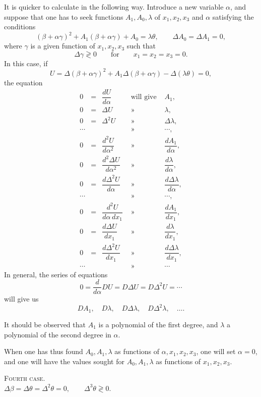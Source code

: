 \documentclass[11pt]{article}
\begin{document}
It is quicker to calculate in the following way. Introduce a new variable $\alpha$, and suppose that one has to seek functions $A_1,A_0,\lambda$ of $x_1,x_2,x_3$ and $\alpha$ satisfying the conditions
\[
(\beta+\alpha\gamma)^2+A_1(\beta+\alpha\gamma)+A_0=\lambda\theta,
\qquad
\Delta A_0=\Delta A_1=0,
\]
where $\gamma$ is a given function of $x_1,x_2,x_3$ such that
\[
\Delta\gamma\gtrless0\qquad \text{for}\qquad x_1=x_2=x_3=0.
\]
In this case, if
\[
U=\Delta(\beta+\alpha\gamma)^2+A_1\Delta(\beta+\alpha\gamma)-\Delta(\lambda\theta)=0,
\]
the equation
\[
\begin{array}{rclcl}
0&=&\dfrac{dU}{d\alpha}&\text{ will give }&A_1,\\[0.2em]
0&=&\Delta U&\text{ » }&\lambda,\\
0&=&\Delta^2 U&\text{ » }&\Delta\lambda,\\
\cdots&&&\text{ » }&\cdots,\\[0.2em]
0&=&\dfrac{d^2U}{d\alpha^2}&\text{ » }&\dfrac{dA_1}{d\alpha},\\[0.2em]
0&=&\dfrac{d^2\Delta U}{d\alpha^2}&\text{ » }&\dfrac{d\lambda}{d\alpha},\\[0.2em]
0&=&\dfrac{d\Delta^2 U}{d\alpha}&\text{ » }&\dfrac{d\Delta\lambda}{d\alpha},\\
\cdots&&&\text{ » }&\cdots,\\[0.2em]
0&=&\dfrac{d^2U}{d\alpha\,dx_1}&\text{ » }&\dfrac{dA_1}{dx_1},\\[0.2em]
0&=&\dfrac{d\Delta U}{dx_1}&\text{ » }&\dfrac{d\lambda}{dx_1},\\[0.2em]
0&=&\dfrac{d\Delta^2 U}{dx_1}&\text{ » }&\dfrac{d\Delta\lambda}{dx_1},\\
\cdots&&&\text{ » }&\cdots
\end{array}
\]
In general, the series of equations
\[
0=\frac{d}{d\alpha}DU=D\Delta U=D\Delta^2U=\cdots
\]
will give us
\[
DA_1,\quad D\lambda,\quad D\Delta\lambda,\quad D\Delta^2\lambda,\quad \ldots.
\]

It should be observed that $A_1$ is a polynomial of the first degree, and $\lambda$ a polynomial of the second degree in $\alpha$.

When one has thus found $A_0,A_1,\lambda$ as functions of $\alpha,x_1,x_2,x_3$, one will set $\alpha=0$, and one will have the values sought for $A_0,A_1,\lambda$ as functions of $x_1,x_2,x_3$.

\begin{center}
{\scshape Fourth case.}\\[0.3em]
$\Delta\beta=\Delta\theta=\Delta^2\theta=0,\qquad \Delta^3\theta\gtrless0.$
\end{center}
\end{document}
